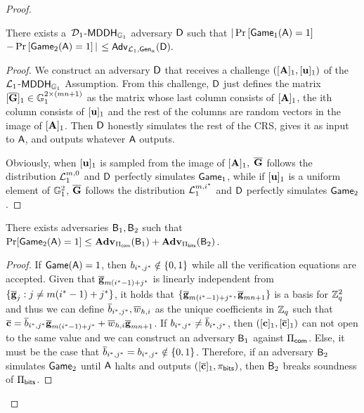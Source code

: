 \begin{proof}
\begin{lemma} There exists a\ $\mathcal{D}_1$-$\mathsf{MDDH}_{\mathbb{G}_1}$ adversary $\mathsf{D}$ such that
$|\Pr\left[\mathsf{Game}_{1}(\mathsf{A})=1\right]$ $-\Pr\left[\mathsf{Game}_{2}(\mathsf{A})=1\right]|$ $\leq
    \mathsf{Adv}_{\mathcal{L}_1,\mathsf{Gen}_a}(\mathsf{D}).$
\end{lemma}
\begin{proof}
We construct an adversary $\mathsf{D}$ that receives 
a challenge $([\mathbf{{A}}]_1,[\mathbf{u}]_1)$ of the 
$\mathcal{L}_1$-$\mathsf{MDDH}_{\mathbb{G}_1}$ Assumption. From this challenge, $\mathsf{D}$ just defines the matrix  $[\overline{\mathbf{{G}}}]_1\in\mathbb{G}_1^{2\times(mn+1)}$ as the matrix whose last column consists of $[\mathbf{{A}}]_1$, the ith column consists of $[\mathbf{u}]_1$ and the rest of the columns are random vectors in the image of $[\mathbf{{A}}]_1$. Then $\mathsf{D}$ honestly simulates the rest of the CRS, gives it as input to $\mathsf{A}$, and outputs whatever $\mathsf{A}$ outputs.

Obviously, when $[\mathbf{u}]_1$ is sampled from 
the image of $[\mathbf{{A}}]_1,$ $\overline{\mathbf{{G}}}$ follows the distribution $\mathcal{L}_1^{m,0}$ and $\mathsf{D}$ perfectly simulates $\mathsf{Game}_1$, while if $[\mathbf{u}]_1$ is a uniform element of $\mathbb{G}^2_1$, $\overline{\mathbf{{G}}}$ follows the distribution $\mathcal{L}_1^{m,i^*}$ and $\mathsf{D}$ perfectly simulates $\mathsf{Game}_2$. 
\end{proof}

\begin{lemma}
There exists adversaries $\mathsf{B}_1,\mathsf{B}_2$ such that $\Pr[\mathsf{Game}_2(\mathsf{A})=1]\leq\mathbf{Adv}_{\Pi_{\mathsf{com}}}(\mathsf{B}_1)+\mathbf{Adv}_{\Pi_{\mathsf{bits}}}(\mathsf{B}_2)$.
\end{lemma}

\begin{proof}
If $\mathsf{Game}(\mathsf{A})=1$, then $b_{i^*,j^*}\notin\{0,1\}$ while all the verification equations are accepted. Given that ${\overline{\mathbf{g}}}_{m(i^*-1)+j^*}$ is linearly independent from $\{{\overline{\mathbf{g}}}_j:j\neq m(i^*-1)+j^*\}$, it holds that $\{{\overline{\mathbf{g}}}_{m(i^*-1)+j^*},{\overline{\mathbf{g}}}_{mn+1}\}$ is a basis for $\mathbb{Z}_q^2$ and thus we can define $\overline{b}_{i^*,j^*},\overline{w}_{h,i}$ as the unique coefficients in $\mathbb{Z}_q$ such that ${\overline{\mathbf{c}}} = \overline{b}_{i^*,j^*}{\overline{\mathbf{g}}}_{m(i^*-1)+j^*}+\overline{w}_{h,i}{\overline{\mathbf{g}}}_{mn+1}$. If $b_{i^*,j^*}\neq\overline{b}_{i^*,j^*}$, then $([\mathbf{c}]_1,[{\overline{\mathbf{c}}}]_1)$ can not open to the same value and we can construct an adversary $\mathsf{B}_1$ against $\Pi_{\mathsf{com}}$. Else, it must be the case that $\overline{b}_{i^*,j^*}=b_{i^*,j^*}\notin\{0,1\}$. Therefore, if an adversary $\mathsf{B}_2$ simulates $\mathsf{Game}_2$ until $\mathsf{A}$ halts and outputs $([{\overline{\mathbf{c}}}]_1,\pi_{\mathsf{bits}})$, then $\mathsf{B}_2$ breaks soundness of $\Pi_{\mathsf{bits}}$. 
\end{proof}


\end{proof}
